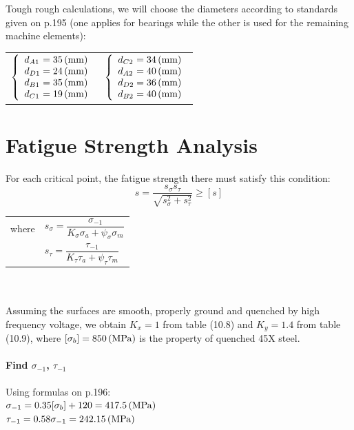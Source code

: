 Tough rough calculations, we will choose the diameters according to standards given on p.195 (one applies for bearings while the other is used for the remaining machine elements):

\begin{tabular}{p{7cm}p{7cm}}
	$
	\left\{ 
	\begin{array}{l@{{} = {}}l}
	d_{A1} & 35 \unitp{mm}\\
	d_{D1} & 24 \unitp{mm}\\
	d_{B1} & 35 \unitp{mm}\\
	d_{C1} & 19 \unitp{mm}\\
	\end{array}
	\right.
	$ &
	$
	\left\{ 
	\begin{array}{l@{{} = {}}l}
	d_{C2} & 34 \unitp{mm}\\
	d_{A2} & 40 \unitp{mm}\\
	d_{D2} & 36 \unitp{mm}\\
	d_{B2} & 40 \unitp{mm}\\
	\end{array}
	\right.
	$
\end{tabular}

\section{Fatigue Strength Analysis}
For each critical point, the fatigue strength there must satisfy this condition:
\[s=\dfrac{s_\sigma s_\tau}{\sqrt{s_\sigma^2+s_\tau^2}}\geq[s]\]
\begin{tabular}{ll}
	where & $ s_\sigma = \dfrac{\sigma_{-1}}{K_\sigma\sigma_a + \psi_\sigma\sigma_m}$\\
	& $ s_\tau = \dfrac{\tau_{-1}}{K_\tau\tau_a + \psi_\tau\tau_m}$
\end{tabular}\\\\
Assuming the surfaces are smooth, properly ground and quenched by high frequency voltage, we obtain $ K_x = 1 $ from table (10.8) and $ K_y = 1.4 $ from table (10.9), where $ [\sigma_b] = 850 \, (\mathrm{MPa}) $ is the property of quenched 45X steel.

\paragraph{Find $ \sigma_{-1}$, $ \tau_{-1} $} Using formulas on p.196:\\
$ \sigma_{-1} = 0.35[\sigma_b] + 120 = 417.5 \, (\mathrm{MPa}) $\\
$ \tau_{-1} = 0.58\sigma_{-1} = 242.15 \, (\mathrm{MPa}) $

